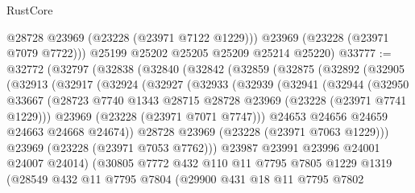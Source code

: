 \begin{lexlean}{RustCore}
\begin{coremodule}
          @28728
          @23969
          (@23228 (@23971 @7122 @1229)))
        @23969
        (@23228 (@23971 @7079 @7722)))
      @25199
      @25202
      @25205
      @25209
      @25214
      @25220)
@33777 := @32772
    (@32797
      (@32838
        (@32840
          (@32842
            (@32859
              (@32875
                (@32892
                  (@32905
                    (@32913
                      (@32917
                        (@32924
                          (@32927
                            (@32933
                              (@32939
                                (@32941
                                  (@32944
                                    (@32950
                                      @33667
                                      (@28723
                                        @7740
                                        @1343
                                        @28715
                                        @28728
                                        @23969
                                        (@23228 (@23971 @7741 @1229)))
                                      @23969
                                      (@23228 (@23971 @7071 @7747)))
                                    @24653
                                    @24656
                                    @24659
                                    @24663
                                    @24668
                                    @24674))
                                @28728
                                @23969
                                (@23228 (@23971 @7063 @1229)))
                              @23969
                              (@23228 (@23971 @7053 @7762)))
                            @23987
                            @23991
                            @23996
                            @24001
                            @24007
                            @24014)
                          (@30805
                            @7772
                            @432
                            @110
                            @11
                            @7795
                            @7805
                            @1229
                            @1319
                            (@28549
                              @432
                              @11
                              @7795
                              @7804
                              (@29900
                                @431
                                @18
                                @11
                                @7795
                                @7802

\end{coremodule}
\end{lexlean}
